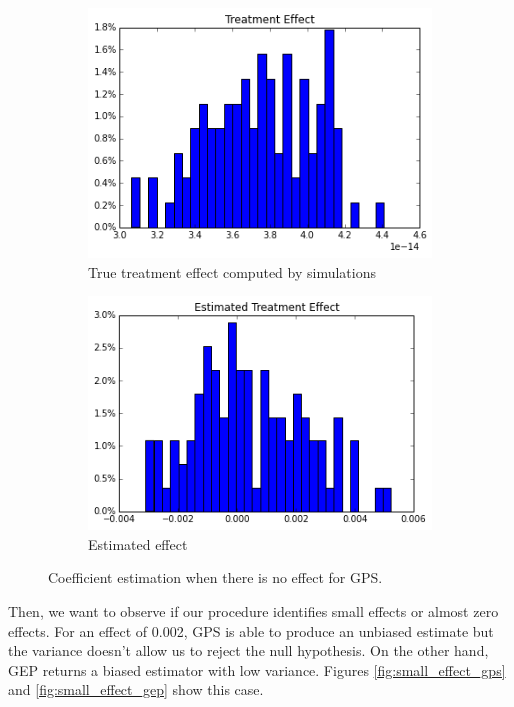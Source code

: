 \documentclass[11pt]{article}
\begin{document}
\begin{figure}[h]
\centering
\begin{subfigure}{.5\textwidth}
  \centering
  \includegraphics[width=.9\linewidth]{treatment_effect_no_influence_real.png}
  \caption{True treatment effect computed by simulations}
  \label{fig:sub1}
\end{subfigure}%
\begin{subfigure}{.5\textwidth}
  \centering
  \includegraphics[width=.9\linewidth]{estimated_no_influence_gep.png}
  \caption{Estimated effect}
  \label{fig:sub2}
\end{subfigure}
\caption{Coefficient estimation when there is no effect for GPS.}
\label{fig:no_effect_gep}
\end{figure}
\FloatBarrier

Then, we want to observe if our procedure identifies small effects or almost zero effects. For an effect of 0.002, GPS is able to produce an unbiased estimate but the variance doesn't allow us to reject the null hypothesis. On the other hand, GEP returns a biased estimator with low variance. Figures \ref{fig:small_effect_gps} and \ref{fig:small_effect_gep} show this case. \\
\end{document}
